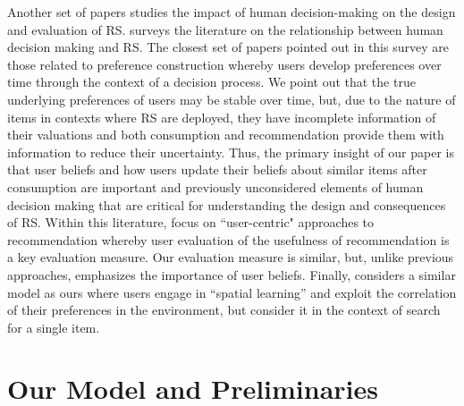 \documentclass[manuscript]{acmart}
\begin{document}
Another set of papers studies the impact of human decision-making on the design and evaluation of RS. \cite{chen2013human} surveys the literature on the relationship between human decision making and RS. The closest set of papers pointed out in this survey are those related to preference construction \cite{bettman1998constructive, lichtenstein2006construction} whereby users develop preferences over time through the context of a decision process. We point out that the true underlying preferences of users may be stable over time, but, due to the nature of items in contexts where RS are deployed, they have incomplete information of their valuations and both consumption and recommendation provide them with information to reduce their uncertainty. Thus, the primary insight of our paper is that user beliefs and how users update their beliefs about similar items after consumption are important and previously unconsidered elements of human decision making that are critical for understanding the design and consequences of RS. Within this literature, \cite{celma2008new, cremonesi2013user, pu2011user} focus on ``user-centric" approaches to recommendation whereby user evaluation of the usefulness of recommendation is a key evaluation measure. Our evaluation measure is similar, but, unlike previous approaches, emphasizes the importance of user beliefs. Finally, \cite{hodgson2019horse} considers a similar model as ours where users engage in ``spatial learning'' and exploit the correlation of their preferences in the environment, but consider it in the context of search for a single item.

\section{Our Model and Preliminaries}
\end{document}
